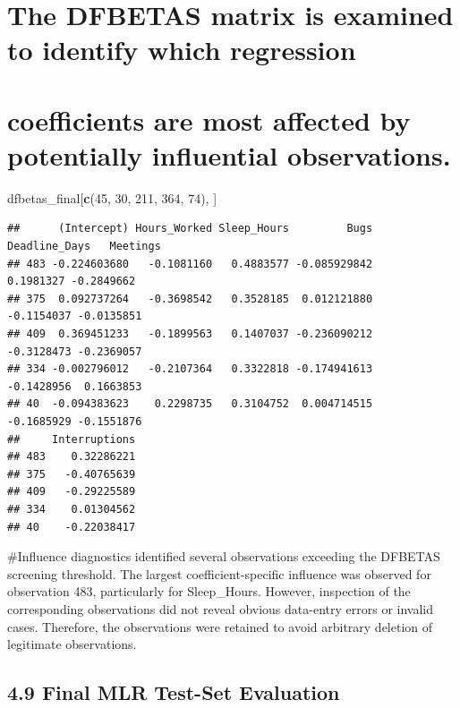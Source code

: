 \documentclass[
]{article}
\newenvironment{Shaded}{\begin{snugshade}}{\end{snugshade}}
\newcommand{\DecValTok}[1]{\textcolor[rgb]{0.00,0.00,0.81}{#1}}
\newcommand{\FunctionTok}[1]{\textcolor[rgb]{0.13,0.29,0.53}{\textbf{#1}}}
\newcommand{\NormalTok}[1]{#1}
\begin{document}
\section{The DFBETAS matrix is examined to identify which
regression}\label{the-dfbetas-matrix-is-examined-to-identify-which-regression}

\section{coefficients are most affected by potentially influential
observations.}\label{coefficients-are-most-affected-by-potentially-influential-observations.}

\begin{Shaded}
\begin{Highlighting}[]
\NormalTok{dfbetas\_final[}\FunctionTok{c}\NormalTok{(}\DecValTok{45}\NormalTok{, }\DecValTok{30}\NormalTok{, }\DecValTok{211}\NormalTok{, }\DecValTok{364}\NormalTok{, }\DecValTok{74}\NormalTok{), ]}
\end{Highlighting}
\end{Shaded}

\begin{verbatim}
##      (Intercept) Hours_Worked Sleep_Hours         Bugs Deadline_Days   Meetings
## 483 -0.224603680   -0.1081160   0.4883577 -0.085929842     0.1981327 -0.2849662
## 375  0.092737264   -0.3698542   0.3528185  0.012121880    -0.1154037 -0.0135851
## 409  0.369451233   -0.1899563   0.1407037 -0.236090212    -0.3128473 -0.2369057
## 334 -0.002796012   -0.2107364   0.3322818 -0.174941613    -0.1428956  0.1663853
## 40  -0.094383623    0.2298735   0.3104752  0.004714515    -0.1685929 -0.1551876
##     Interruptions
## 483    0.32286221
## 375   -0.40765639
## 409   -0.29225589
## 334    0.01304562
## 40    -0.22038417
\end{verbatim}

\#Influence diagnostics identified several observations exceeding the
DFBETAS screening threshold. The largest coefficient-specific influence
was observed for observation 483, particularly for Sleep\_Hours.
However, inspection of the corresponding observations did not reveal
obvious data-entry errors or invalid cases. Therefore, the observations
were retained to avoid arbitrary deletion of legitimate observations.

\subsection{4.9 Final MLR Test-Set
Evaluation}\label{final-mlr-test-set-evaluation}
\end{document}
